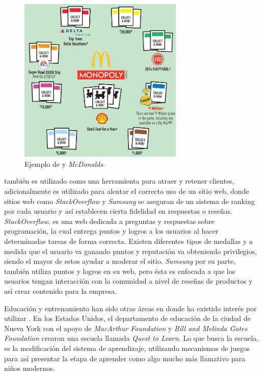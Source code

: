 \begin{figure}[!htb]
  \centering
  \includegraphics[width=0.7\textwidth]{images/Gam_mcdonalds.jpg}
  \caption[\emph{Mcdonalds} y {\gam}]{Ejemplo de {\gam} y \emph{McDonalds}}
  \label{fig:mcdonalds}
\end{figure}



{\GAM} también es utilizado como una herramienta para atraer y retener clientes,
adicionalmente es utilizado para alentar el correcto uso de un sitio web,
donde sitios web como \emph{StackOverflow} \cite{StackOverflow}y \emph{Samsung} se aseguran de un sistema
de ranking por cada usuario y así establecen cierta fidelidad en respuestas
o reseñas.
\emph{StackOverflow}, es una web dedicada a preguntas y respuestas sobre programación,
la cual entrega puntos  y logros a los usuarios al hacer determinadas tareas
de forma correcta.
Existen diferentes tipos de medallas y a medida que el usuario va ganando
puntos y reputación va obteniendo privilegios, siendo el mayor de estos ayudar a
moderar el sitio.
\emph{Samsung} por su parte, también utiliza puntos y logros en su web, pero ésta
es enfocada a que los usuarios tengan interacción con la comunidad a nivel de
reseñas de productos y así crear contenido para la empresa\cite{Gam:Util:3}.

Educación y entrenamiento han sido otras áreas en donde ha existido interés por
utilizar {\gam}.
En los Estados Unidos, el departamento de educación de la ciudad de Nueva York
con el apoyo de \emph{MacArthur Foundation} y \emph{Bill and Melinda Gates
Foundation} crearon una escuela  llamada \emph{Quest to Learn}.
Lo que busca la escuela, es la modificación del sistema de aprendizaje,
utilizando mecanismos de juegos para así presentar la etapa de aprender
como algo mucho más llamativo para niños modernos\cite{Gam:Util:4}.

